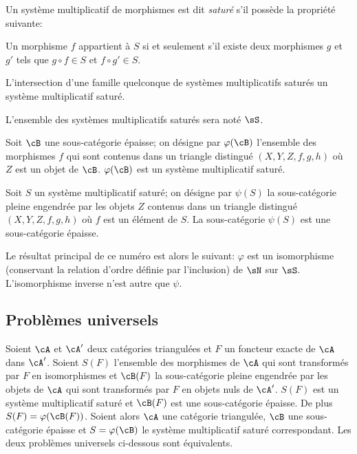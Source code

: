 Un syst\`eme multiplicatif de morphismes est dit \emph{satur\'e} s'il poss\`ede 
la propri\'et\'e suivante: 

Un morphisme $f$ appartient \`a $S$ si et seulement s'il existe deux 
morphismes $g$ et $g'$ tels que $g\circ f\in S$ et $f\circ g'\in S$. 

L'intersection d'une famille quelconque de syst\`emes multiplicatifs satur\'es 
un syst\`eme multiplicatif satur\'e. 

L'ensemble des syst\`emes multiplicatifs satur\'es sera not\'e $\sS$. 

Soit $\cB$ une sous-cat\'egorie \'epaisse; on d\'esigne par $\varphi(\cB)$ 
l'ensemble des morphismes $f$ qui sont contenus dans un triangle distingu\'e 
$(X,Y,Z,f,g,h)$ o\`u $Z$ est un objet de $\cB$. $\varphi(\cB)$ est un 
syst\`eme multiplicatif satur\'e. 

Soit $S$ un syst\`eme multiplicatif satur\'e; on d\'esigne par $\psi(S)$ la 
sous-cat\'egorie pleine engendr\'ee par les objets $Z$ contenus dans un 
triangle distingu\'e $(X,Y,Z,f,g,h)$ o\`u $f$ est un \'el\'ement de $S$. La 
sous-cat\'egorie $\psi(S)$ est une sous-cat\'egorie \'epaisse. 

Le r\'esultat principal de ce num\'ero est alors le suivant: $\varphi$ est un 
isomorphisme (conservant la relation d'ordre d\'efinie par l'inclusion) de 
$\sN$ sur $\sS$. L'isomorphisme inverse n'est autre que $\psi$. 










\subsection{Probl\`emes universels}\label{VIII:2-2}

Soient $\cA$ et $\cA'$ deux cat\'egories triangul\'ees et $F$ un foncteur 
exacte de $\cA$ dans $\cA'$. Soient $S(F)$ l'ensemble des morphismes de $\cA$ 
qui sont transform\'es par $F$ en isomorphismes et $\cB(F)$ la sous-cat\'egorie 
pleine engendr\'ee par les objets de $\cA$ qui sont transform\'es par $F$ en 
objets nuls de $\cA'$. $S(F)$ est un syst\`eme multiplicatif satur\'e et 
$\cB(F)$ est une sous-cat\'egorie \'epaisse. De plus $S(F) = \varphi(\cB(F))$. 
Soient alors $\cA$ une cat\'egorie triangul\'ee, $\cB$ une sous-cat\'egorie 
\'epaisse et $S=\varphi(\cB)$ le syst\`eme multiplicatif satur\'e 
correspondant. Les deux probl\`emes universels ci-dessous sont \'equivalents. 


